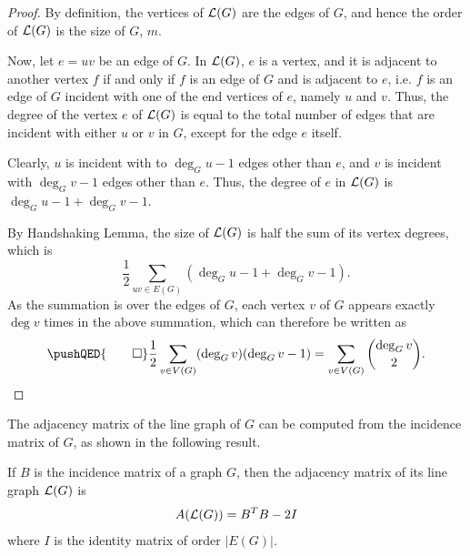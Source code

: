 \begin{proof}
By definition, the vertices of $\operatorname{\mathcal L}(G)$ are the edges of $G$, and hence the order of $\operatorname{\mathcal L}(G)$ is the size of $G$, $m$.

Now, let $e = uv$ be an edge of $G$. In $\operatorname{\mathcal L}(G)$, $e$ is a vertex, and it is adjacent to another vertex $f$ if and only if $f$ is an edge of $G$ and is adjacent to $e$, i.e. $f$ is an edge of $G$ incident with one of the end vertices of $e$, namely $u$ and $v$. Thus, the degree of the vertex $e$ of $\operatorname{\mathcal L}(G)$ is equal to the total number of edges that are incident with either $u$ or $v$ in $G$, except for the edge $e$ itself.

Clearly, $u$ is incident with to $\deg_G u - 1$ edges other than $e$, and $v$ is incident with $\deg_G v - 1$ edges other than $e$. Thus, the degree of $e$ in $\operatorname{\mathcal L}(G)$ is $\deg_G u  - 1 + \deg_G v - 1$.

By Handshaking Lemma, the size of $\operatorname{\mathcal L}(G)$ is half the sum of its vertex degrees, which is
\begin{equation*}
	\frac 1 2 \sum_{uv \in E(G)} (\deg_G u - 1 + \deg_G v - 1).
\end{equation*}
As the summation is over the edges of $G$, each vertex $v$ of $G$ appears exactly $\deg v$ times in the above summation, which can therefore be written as
\begin{equation*}
	\pushQED{\qed}
	\frac 1 2 \sum_{v \in V(G)} (\deg_G v)(\deg_G v - 1) = \sum_{v \in V(G)} \binom{\deg_G v}{2}.\qedhere
\end{equation*}
\end{proof}

The adjacency matrix of the line graph of $G$ can be computed from the incidence matrix of $G$, as shown in the following result.

\begin{Theorem}
	If $B$ is the incidence matrix of a graph $G$, then the adjacency matrix of its line graph $\operatorname{\mathcal L}(G)$ is
	\begin{equation*}
		A\pqty{\LG(G)} = B^T B - 2I
	\end{equation*}
	where $I$ is the identity matrix of order $|E(G)|$.
\end{Theorem}

